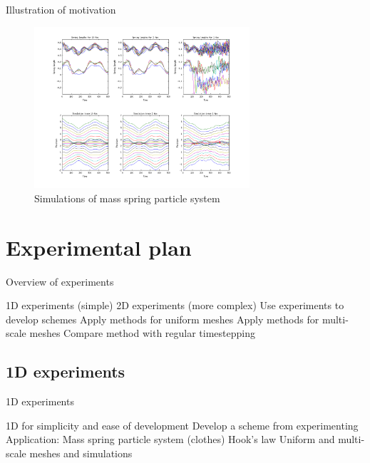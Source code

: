 \begin{frame}{Illustration of motivation}
    \begin{figure}
        \center
        \includegraphics[width=\linewidth,height=6cm]{../images/spring_motivation.png}
        \caption{Simulations of mass spring particle system}
        \label{fig:motivation}
    \end{figure}
\end{frame}

\section{Experimental plan}
\begin{frame}{Overview of experiments}
    \pause\begin{itemize}[<+->]
        \itemv 1D experiments (simple)
        \itemv 2D experiments (more complex)
        \itemv Use experiments to develop schemes
        \itemv Apply methods for uniform meshes 
        \itemv Apply methods for multi-scale meshes
        \itemv Compare method with regular timestepping
    \end{itemize}
\end{frame}

\subsection{1D experiments}
\begin{frame}{1D experiments}
    \pause\begin{itemize}[<+->]
        \itemv 1D for simplicity and ease of development
        \itemv Develop a scheme from experimenting
        \itemv Application: Mass spring particle system (clothes)
        \itemv Hook's law
        \itemv Uniform and multi-scale meshes and simulations
    \end{itemize}
\end{frame}

